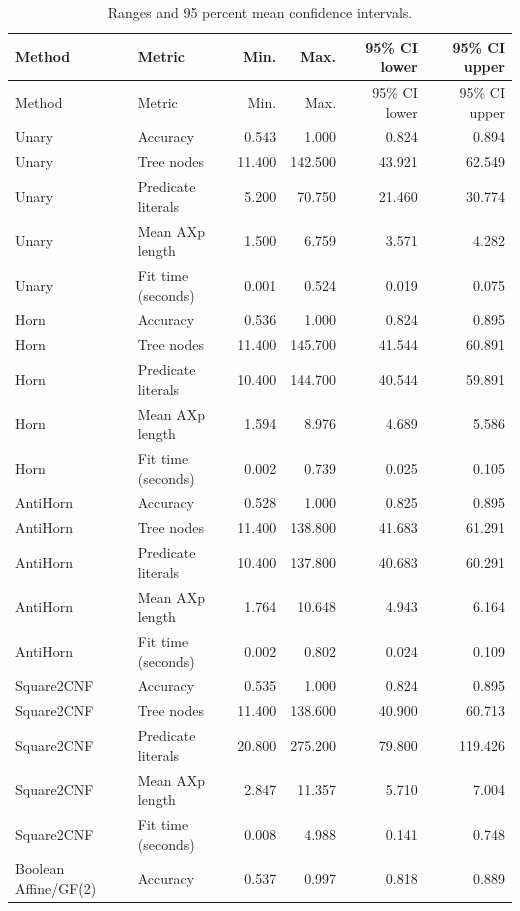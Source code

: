 \begingroup
\small
\setlength{\tabcolsep}{3pt}
\begin{longtable}{llrrrr}
\caption{Ranges and 95 percent mean confidence intervals.}\label{tab:descriptive-statistics-intervals}\\
\toprule
Method & Metric & Min. & Max. & 95\% CI lower & 95\% CI upper \\
\midrule
\endfirsthead
\toprule
Method & Metric & Min. & Max. & 95\% CI lower & 95\% CI upper \\
\midrule
\endhead
Unary & Accuracy & 0.543 & 1.000 & 0.824 & 0.894 \\
Unary & Tree nodes & 11.400 & 142.500 & 43.921 & 62.549 \\
Unary & Predicate literals & 5.200 & 70.750 & 21.460 & 30.774 \\
Unary & Mean AXp length & 1.500 & 6.759 & 3.571 & 4.282 \\
Unary & Fit time (seconds) & 0.001 & 0.524 & 0.019 & 0.075 \\
Horn & Accuracy & 0.536 & 1.000 & 0.824 & 0.895 \\
Horn & Tree nodes & 11.400 & 145.700 & 41.544 & 60.891 \\
Horn & Predicate literals & 10.400 & 144.700 & 40.544 & 59.891 \\
Horn & Mean AXp length & 1.594 & 8.976 & 4.689 & 5.586 \\
Horn & Fit time (seconds) & 0.002 & 0.739 & 0.025 & 0.105 \\
AntiHorn & Accuracy & 0.528 & 1.000 & 0.825 & 0.895 \\
AntiHorn & Tree nodes & 11.400 & 138.800 & 41.683 & 61.291 \\
AntiHorn & Predicate literals & 10.400 & 137.800 & 40.683 & 60.291 \\
AntiHorn & Mean AXp length & 1.764 & 10.648 & 4.943 & 6.164 \\
AntiHorn & Fit time (seconds) & 0.002 & 0.802 & 0.024 & 0.109 \\
Square2CNF & Accuracy & 0.535 & 1.000 & 0.824 & 0.895 \\
Square2CNF & Tree nodes & 11.400 & 138.600 & 40.900 & 60.713 \\
Square2CNF & Predicate literals & 20.800 & 275.200 & 79.800 & 119.426 \\
Square2CNF & Mean AXp length & 2.847 & 11.357 & 5.710 & 7.004 \\
Square2CNF & Fit time (seconds) & 0.008 & 4.988 & 0.141 & 0.748 \\
Boolean Affine/GF(2) & Accuracy & 0.537 & 0.997 & 0.818 & 0.889 \\

\end{longtable}
